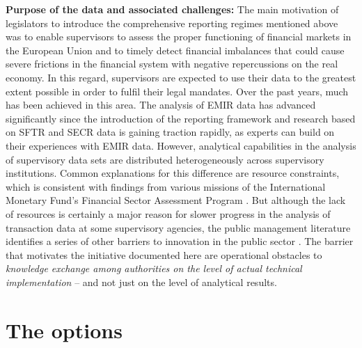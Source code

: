 \documentclass[a4paper, 11pt]{report}
\begin{document}
\textbf{Purpose of the data and associated challenges:} The main motivation of legislators to introduce the comprehensive reporting regimes mentioned above was to enable supervisors to assess the proper functioning of financial markets in the European Union and to timely detect financial imbalances that could cause severe frictions in the financial system with negative repercussions on the real economy. In this regard, supervisors are expected to use their data to the greatest extent possible in order to fulfil their legal mandates. Over the past years, much has been achieved in this area. The analysis of EMIR data has advanced significantly since the introduction of the reporting framework and research based on SFTR and SECR data is gaining traction rapidly, as experts can build on their experiences with EMIR data. However, analytical capabilities in the analysis of supervisory data sets are distributed heterogeneously across supervisory institutions. Common explanations for this difference are resource constraints, which is consistent with findings from various missions of the International Monetary Fund's Financial Sector Assessment Program \parencite{Dordevic.2021}. But although the lack of resources is certainly a major reason for slower progress in the analysis of transaction data at some supervisory agencies, the public management literature identifies a series of other barriers to innovation in the public sector \parencite{Cinar.2019}. The barrier that motivates the initiative documented here are operational obstacles to \emph{knowledge exchange among authorities on the level of actual technical implementation} -- and not just on the level of analytical results.

\section{The options\label{sec:intro-motivation}}
\end{document}

